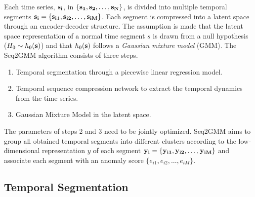 \documentclass[twoside,twocolumn]{article}
\begin{document}
Each time series, $\bf{s}_i$, in $\{\bf{s}_1, \bf{s}_2, \dots, \bf{s}_N\}$, is divided into multiple temporal segments $\bf{s}_i=\{\bf{s}_{i1}, \bf{s}_{i2}, \dots, \bf{s}_{iM}\}$.  Each segment is compressed into a latent space through an encoder-decoder structure.  The assumption is made that the latent space representation of a normal time segment $s$ is drawn from a null hypothesis ($H_0 \sim h_0({\bf{s})}$) and that $h_0({\bf{s})}$ follows a {\em Gaussian mixture model} (GMM).  The Seq2GMM algorithm consists of three steps.
\begin{enumerate}
	\item Temporal segmentation through a piecewise linear regression model.
	\item Temporal sequence compression network to extract the temporal dynamics from the time series.
	\item Gaussian Mixture Model in the latent space.
\end{enumerate}
The parameters of steps 2 and 3 need to be jointly optimized.  Seq2GMM aims to group all obtained temporal segments into different clusters according to the low-dimensional representation $y$ of each segment $\bf{y}_i=\{\bf{y}_{i1}, \bf{y}_{i2}, \dots, \bf{y}_{iM}\}$ and associate each segment with an anomaly score $\{e_{i1}, e_{i2}, \dots, e_{iM}\}$.

\subsection{Temporal Segmentation}
\end{document}
